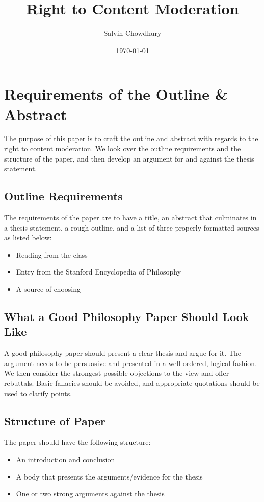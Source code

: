 \documentclass[a4paper]{article}
\title{Right to Content Moderation}
\author{Salvin Chowdhury}
\date{\today}
\begin{document}
\maketitle

\newpage
\tableofcontents
\newpage

\section{Requirements of the Outline \& Abstract}
The purpose of this paper is to craft the outline and abstract with regards to the right to content moderation. We 
look over the outline requirements and the structure of the paper, and then develop an argument for and against the 
thesis statement.

\subsection{Outline Requirements}
The requirements of the paper are to have a title, an abstract that culminates in a thesis statement, a rough outline,
and a list of three properly formatted sources as listed below:
\begin{itemize}
    \item Reading from the class
    \item Entry from the Stanford Encyclopedia of Philosophy
    \item A source of choosing
\end{itemize}

\subsection{What a Good Philosophy Paper Should Look Like}
A good philosophy paper should present a clear thesis and argue for it. The argument needs to be persuasive and 
presented in a well-ordered, logical fashion. We then consider the strongest possible objections to the view and offer
rebuttals. Basic fallacies should be avoided, and appropriate quotations should be used to clarify points.

\subsection{Structure of Paper}
The paper should have the following structure:
\begin{itemize}
    \item An introduction and conclusion
    \item A body that presents the arguments/evidence for the thesis
    \item One or two strong arguments against the thesis
\end{itemize}
\end{document}
